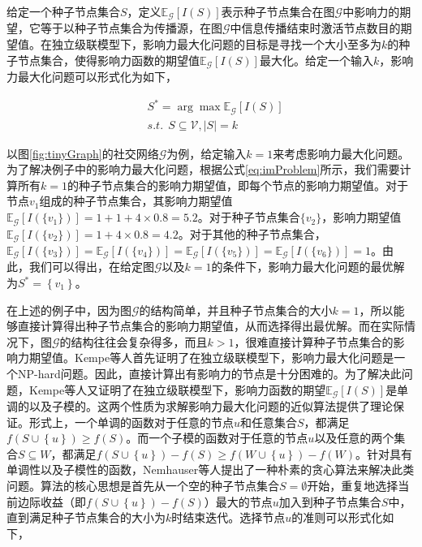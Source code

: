 给定一个种子节点集合$S$，定义$\mathbb{E}_\mathcal{G}\left[I\left(S\right)\right]$表示种子节点集合在图$\mathcal{G}$中影响力的期望，它等于以种子节点集合为传播源，在图$\mathcal{G}$中信息传播结束时激活节点数目的期望值。在独立级联模型下，影响力最大化问题的目标是寻找一个大小至多为$k$的种子节点集合，使得影响力函数的期望值$\mathbb{E}_\mathcal{G}\left[I\left(S\right)\right]$最大化。给定一个输入$k$，影响力最大化问题可以形式化为如下，

\begin{equation}\label{eq:imProblem}
    \begin{split}
        &S^{\ast} = \arg\max{\mathbb{E}_\mathcal{G}\left[I\left(S\right)\right]}\\
        &s.t.~~S \subseteq \mathcal{V},\left\vert{S}\right\vert = k
    \end{split}
\end{equation}

以图\ref{fig:tinyGraph}的社交网络$\mathcal{G}$为例，给定输入$k=1$来考虑影响力最大化问题。为了解决例子中的影响力最大化问题，根据公式\ref{eq:imProblem}所示，我们需要计算所有$k=1$的种子节点集合的影响力期望值，即每个节点的影响力期望值。对于节点$v_1$组成的种子节点集合，其影响力期望值$\mathbb{E}_\mathcal{G}\left[I\left(\{v_1\}\right)\right]=1+1+4\times0.8=5.2$。对于种子节点集合$\{v_2\}$，影响力期望值$\mathbb{E}_\mathcal{G}\left[I\left(\{v_2\}\right)\right]=1+4\times0.8=4.2$。对于其他的种子节点集合，$\mathbb{E}_\mathcal{G}\left[I\left(\{v_3\}\right)\right]=
\mathbb{E}_\mathcal{G}\left[I\left(\{v_4\}\right)\right]=
\mathbb{E}_\mathcal{G}\left[I\left(\{v_5\}\right)\right]=
\mathbb{E}_\mathcal{G}\left[I\left(\{v_6\}\right)\right]=1$。由此，我们可以得出，在给定图$\mathcal{G}$以及$k=1$的条件下，影响力最大化问题的最优解为$S^\ast=\left\{v_1\right\}$。

在上述的例子中，因为图$\mathcal{G}$的结构简单，并且种子节点集合的大小$k=1$，所以能够直接计算得出种子节点集合的影响力期望值，从而选择得出最优解。而在实际情况下，图$\mathcal{G}$的结构往往会复杂得多，而且$k>1$，很难直接计算种子节点集合的影响力期望值。Kempe等人首先证明了在独立级联模型下，影响力最大化问题是一个NP-hard问题。因此，直接计算出有影响力的节点是十分困难的。为了解决此问题，Kempe等人又证明了在独立级联模型下，影响力函数的期望$\mathbb{E}_\mathcal{G}\left[I\left(S\right)\right]$是单调的以及子模的。这两个性质为求解影响力最大化问题的近似算法提供了理论保证。形式上，一个单调的函数对于任意的节点$u$和任意集合$S$，都满足$f\left(S\cup\left\{u\right\}\right) \geq f\left(S\right)$。而一个子模的函数对于任意的节点$u$以及任意的两个集合$S \subseteq W$，都满足$f\left(S\cup\left\{u\right\}\right) - f\left(S\right) \geq f\left(W\cup\left\{u\right\}\right) - f\left(W\right)$。针对具有单调性以及子模性的函数，Nemhauser等人提出了一种朴素的贪心算法来解决此类问题。算法的核心思想是首先从一个空的种子节点集合$S=\emptyset$开始，重复地选择当前边际收益（即$f\left(S\cup\left\{u\right\}\right) - f\left(S\right)$）最大的节点$u$加入到种子节点集合$S$中，直到满足种子节点集合的大小为$k$时结束迭代。选择节点$u$的准则可以形式化如下，

